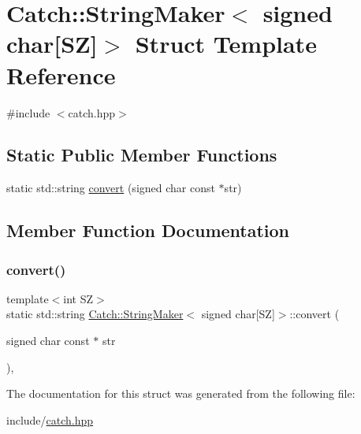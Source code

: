 \hypertarget{struct_catch_1_1_string_maker_3_01signed_01char[_s_z]_4}{}\section{Catch\+::String\+Maker$<$ signed char\mbox{[}SZ\mbox{]}$>$ Struct Template Reference}
\label{struct_catch_1_1_string_maker_3_01signed_01char[_s_z]_4}


{\ttfamily \#include $<$catch.\+hpp$>$}

\subsection*{Static Public Member Functions}
\begin{DoxyCompactItemize}
\item 
static std\+::string \mbox{\hyperlink{struct_catch_1_1_string_maker_3_01signed_01char[_s_z]_4_a23ac689cc79dbcfe9b1765fe9e25690e}{convert}} (signed char const $\ast$str)
\end{DoxyCompactItemize}


\subsection{Member Function Documentation}
\mbox{\label{struct_catch_1_1_string_maker_3_01signed_01char[_s_z]_4_a23ac689cc79dbcfe9b1765fe9e25690e}} 
\subsubsection{\texorpdfstring{convert()}{convert()}}
{\footnotesize\ttfamily template$<$int SZ$>$ \\
static std\+::string \mbox{\hyperlink{struct_catch_1_1_string_maker}{Catch\+::\+String\+Maker}}$<$ signed char\mbox{[}SZ\mbox{]}$>$\+::convert (\begin{DoxyParamCaption}\item[{signed char const $\ast$}]{str }\end{DoxyParamCaption})\hspace{0.3cm}{\ttfamily [inline]}, {\ttfamily [static]}}



The documentation for this struct was generated from the following file\+:\begin{DoxyCompactItemize}
\item 
include/\mbox{\hyperlink{catch_8hpp}{catch.\+hpp}}\end{DoxyCompactItemize}
